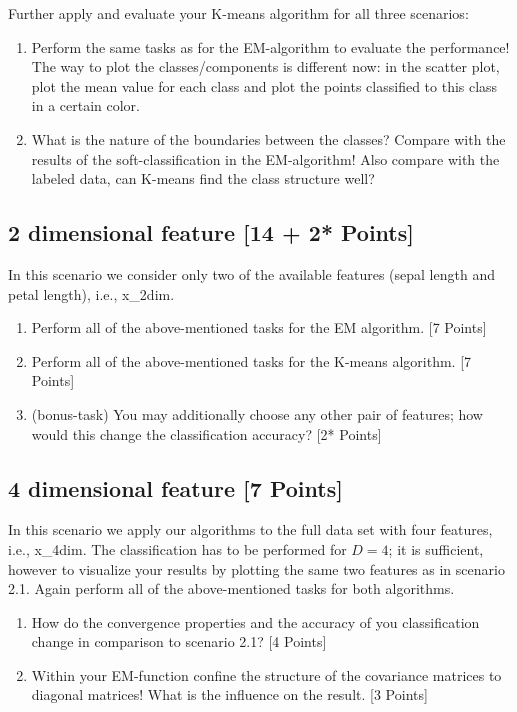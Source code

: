 \documentclass[a4paper]{article}
\begin{document}
Further apply and evaluate your K-means algorithm for all three scenarios:
\begin{enumerate}[resume]
  \item Perform the same tasks as for the EM-algorithm to evaluate the performance! The way to plot the classes/components is different now: in the scatter plot, plot the mean value for each class and plot the points classified to this class in a certain color.
  \item  What is the nature of the boundaries between the classes? Compare with the results of the soft-classification in the EM-algorithm! Also compare with the labeled data, can K-means find the class structure well?
\end{enumerate}



\subsection{2 dimensional feature [14 + 2* Points]}
In this scenario we consider only two of the available features (sepal length and petal length), i.e., x\_2dim.
\begin{enumerate}
  \item Perform all of the above-mentioned tasks for the EM algorithm. [7 Points]
  \item Perform all of the above-mentioned tasks for the K-means algorithm. [7 Points]
  \item  (bonus-task) You may additionally choose any other pair of features; how would this change the classification accuracy? [2* Points]
\end{enumerate}



\subsection{4 dimensional feature [7 Points]}
In this scenario we apply our algorithms to the full data set with four features, i.e., x\_4dim. The classification has to be performed for $D = 4$; it is sufficient, however to visualize your results by plotting the same two features as in scenario 2.1. Again perform all of the above-mentioned tasks for both algorithms.
\begin{enumerate}
  \item How do the convergence properties and the accuracy of you classification change in comparison to scenario 2.1? [4 Points]
  \item Within your EM-function confine the structure of the covariance matrices to diagonal matrices! What is the influence on the result. [3 Points]
\end{enumerate}
\end{document}
